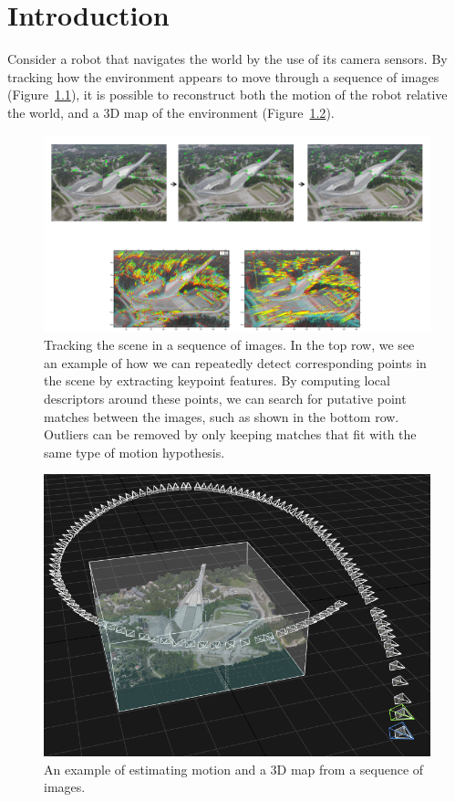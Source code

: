 \chapter{Introduction}
Consider a robot that navigates the world by the use of its camera sensors.
By tracking how the environment appears to move through a sequence of images (Figure~\ref{fig:keypoint-matches}), it is possible to reconstruct both the motion of the robot relative the world, and a 3D map of the environment (Figure~\ref{fig:sfm}).
\begin{figure}[htb]
    \centering
    \includegraphics[width=\columnwidth]{figures/keypoint_matches.png}
    \caption{
    Tracking the scene in a sequence of images.
    In the top row, we see an example of how we can repeatedly detect corresponding points in the scene by extracting keypoint features. 
    By computing local descriptors around these points, we can search for putative point matches between the images, such as shown in the bottom row. 
    Outliers can be removed by only keeping matches that fit with the same type of motion hypothesis.
    }
    \label{fig:keypoint-matches}
\end{figure}
\begin{figure}[htb]
    \centering
    \includegraphics[width=0.75\columnwidth]{figures/holmenkollen-3d.png}
    \caption{An example of estimating motion and a 3D map from a sequence of images.}
    \label{fig:sfm}
\end{figure}

